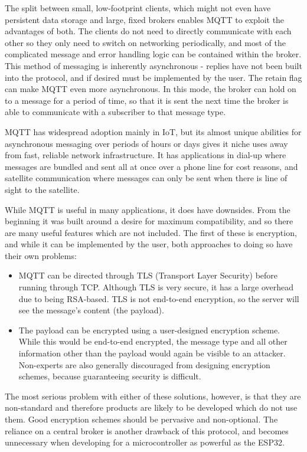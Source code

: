 \documentclass{article}
\begin{document}
The split between small, low-footprint clients, which might not even have persistent data storage and large, fixed brokers enables MQTT to exploit the advantages of both. The clients do not need to directly communicate with each other so they only need to switch on networking periodically, and most of the complicated message and error handling logic can be contained within the broker. This method of messaging is inherently asynchronous - replies have not been built into the protocol, and if desired must be implemented by the user. The retain flag can make MQTT even more asynchronous. In this mode, the broker can hold on to a message for a period of time, so that it is sent the next time the broker is able to communicate with a subscriber to that message type. 

MQTT has widespread adoption mainly in IoT, but its almost unique abilities for asynchronous messaging over periods of hours or days gives it niche uses away from fast, reliable network infrastructure. It has applications in dial-up where messages are bundled and sent all at once over a phone line for cost reasons, and satellite communication where messages can only be sent when there is line of sight to the satellite.

While MQTT is useful in many applications, it does have downsides. From the beginning it was built around a desire for maximum compatibility, and so there are many useful features which are not included. The first of these is encryption, and while it can be implemented by the user, both approaches to doing so have their own problems:
\begin{itemize}
\item MQTT can be directed through TLS (Transport Layer Security) before running through TCP. Although TLS is very secure, it has a large overhead due to being RSA-based. TLS is not end-to-end encryption, so the server will see the message's content (the payload).
\item The payload can be encrypted using a user-designed encryption scheme. While this would be end-to-end encrypted, the message type and all other information other than the payload would again be visible to an attacker. Non-experts are also generally discouraged from designing encryption schemes, because guaranteeing security is difficult.
\end{itemize}

The most serious problem with either of these solutions, however, is that they are non-standard and therefore products are likely to be developed which do not use them. Good encryption schemes should be pervasive and non-optional. The reliance on a central broker is another drawback of this protocol, and becomes unnecessary when developing for a microcontroller as powerful as the ESP32.
\end{document}
